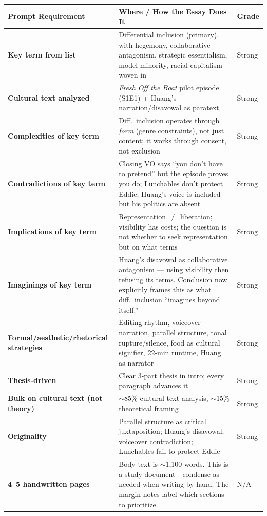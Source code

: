 \documentclass[12pt]{article}
\begin{document}
\renewcommand{\arraystretch}{1.4}
\begin{tabularx}{\textwidth}{|>{\raggedright\arraybackslash\bfseries}p{3.8cm}|X|>{\centering\arraybackslash}p{1.2cm}|}
\hline
\textbf{Prompt Requirement} & \textbf{Where / How the Essay Does It} & \textbf{Grade} \\
\hline
Key term from list & Differential inclusion (primary), with hegemony, collaborative antagonism, strategic essentialism, model minority, racial capitalism woven in & Strong \\
\hline
Cultural text analyzed & \textit{Fresh Off the Boat} pilot episode (S1E1) + Huang's narration/disavowal as paratext & Strong \\
\hline
Complexities of key term & Diff.\ inclusion operates through \textit{form} (genre constraints), not just content; it works through consent, not exclusion & Strong \\
\hline
Contradictions of key term & Closing VO says ``you don't have to pretend'' but the episode proves you do; Lunchables don't protect Eddie; Huang's voice is included but his politics are absent & Strong \\
\hline
Implications of key term & Representation $\neq$ liberation; visibility has costs; the question is not whether to seek representation but on what terms & Strong \\
\hline
Imaginings of key term & Huang's disavowal as collaborative antagonism --- using visibility then refusing its terms. Conclusion now explicitly frames this as what diff.\ inclusion ``imagines beyond itself.'' & Strong \\
\hline
Formal/aesthetic/rhetorical strategies & Editing rhythm, voiceover narration, parallel structure, tonal rupture/silence, food as cultural signifier, 22-min runtime, Huang as narrator & Strong \\
\hline
Thesis-driven & Clear 3-part thesis in intro; every paragraph advances it & Strong \\
\hline
Bulk on cultural text (not theory) & $\sim$85\% cultural text analysis, $\sim$15\% theoretical framing & Strong \\
\hline
Originality & Parallel structure as critical juxtaposition; Huang's disavowal; voiceover contradiction; Lunchables fail to protect Eddie & Strong \\
\hline
4--5 handwritten pages & Body text is $\sim$1,100 words. This is a study document---condense as needed when writing by hand. The margin notes label which sections to prioritize. & N/A \\
\hline
\end{tabularx}
\end{document}
